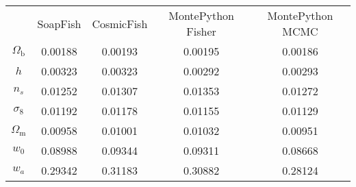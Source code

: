 \begin{table}
\centering
\begin{tabular}{|c|c|c|c|c|}
 & SoapFish & CosmicFish & MontePython Fisher & MontePython MCMC \\
$\Omega_\mathrm{b}$ & 0.00188 & 0.00193 & 0.00195 & 0.00186 \\
$h$ & 0.00323 & 0.00323 & 0.00292 & 0.00293 \\
$n_s$ & 0.01252 & 0.01307 & 0.01353 & 0.01272 \\
$\sigma_8$ & 0.01192 & 0.01178 & 0.01155 & 0.01129 \\
$\Omega_\mathrm{m}$ & 0.00958 & 0.01001 & 0.01032 & 0.00951 \\
$w_0$ & 0.08988 & 0.09344 & 0.09311 & 0.08668 \\
$w_a$ & 0.29342 & 0.31183 & 0.30882 & 0.28124 \\
\end{tabular}
\end{table}
